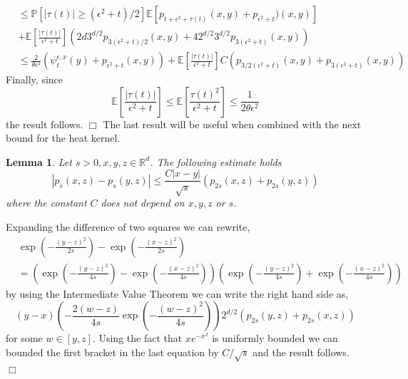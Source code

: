 \documentclass[12pt]{article}
\newenvironment {proof}{{\noindent\bf Proof }}{\hfill $\Box$ \medskip}
\newtheorem{lemma}[theorem]{Lemma}
\newcommand{\IP}{\mathbb P}
\newcommand{\IE}{\mathbb E}
\begin{document}
\begin{proof}
\begin{align*}
    &\leq
    \IP[|\tau(t)| \geq (\epsilon^2+t)/2] \IE[p_{t+\epsilon^2+\tau(t)}(x,y) + p_{\epsilon^2+t})(x,y)] \\
    &+
    \mathbb{E}\left[ \frac{|\tau(t)|}{\epsilon^2+t}\right]\left( 2d3^{d/2} p_{3(\epsilon^2+t)/2} (x,y) + 4 2^{d/2}3^{d/2} p_{3(\epsilon^2+t)}(x,y)\right) \\
    & \leq
    \frac{2}{\theta \epsilon^2} (\psi_t^{\epsilon,x}(y)+p_{\epsilon^2+t}(x,y)) + \mathbb{E}\left[ \frac{|\tau(t)|}{\epsilon^2+t}\right] C (p_{3/2(\epsilon^2+t)}(x,y) + p_{3(\epsilon^2+t)}(x,y))
\end{align*}
Finally, since
\[ \mathbb{E}\left[ \frac{|\tau(t)|}{\epsilon^2+t}\right] \leq \mathbb{E}\left[ \frac{\tau(t)^2}{\epsilon^2+t}\right] \leq \frac{1}{2 \theta \epsilon^2} \]
the result follows.
\end{proof}
The last result will be useful when combined with the next bound for the heat kernel.
\begin{lemma}
Let $s>0, x, y, z\in \mathbb{R}^d$. The following estimate holds
\[ |p_s(x,z) - p_s(y,z)| \leq \frac{C|x-y|}{\sqrt{s}} \left(p_{2s}(x,z) + p_{2s}(y,z)\right) \]
where the constant $C$ does not depend on $x,y,z$ or $s$.\label{Lemma:ContinuityHS}
\end{lemma}
\begin{proof}
Expanding the difference of two squares we can rewrite,
\begin{align*}
&\exp\left(-\frac{(y-z)^2}{2 s} \right)-\exp\left(-\frac{(x-z)^2}{2 s} \right) \\ &= \left(\exp\left(-\frac{(y-z)^2}{4 s} \right)-\exp\left(-\frac{(x-z)^2}{4 s} \right) \right)\left(\exp\left(-\frac{(y-z)^2}{4 s} \right)+\exp\left(-\frac{(x-z)^2}{4 s} \right) \right)
\end{align*}
by using the Intermediate Value Theorem we can write the right hand side as,
\[ (y-x) \left( - \frac{2(w-z)}{4s} \exp\left(-\frac{(w-z)^2}{4s}\right)\right) 2^{d/2}\left( p_{2s}(y,z)+p_{2s}(x,z) \right)\]
for some $w \in [y,z]$. Using the fact that $x e^{-x^2}$ is uniformly bounded we can bounded the first bracket in the last equation by $C/\sqrt{s}$ and the result follows.
\end{proof}
\end{document}
